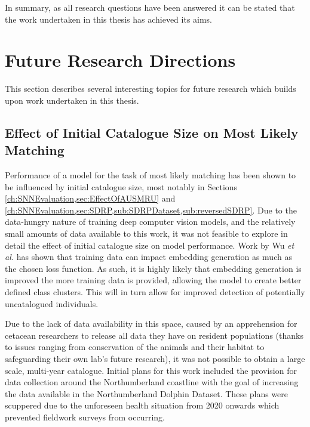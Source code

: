In summary, as all research questions have been answered it can be stated that the work undertaken in this thesis has achieved its aims. 

\section{Future Research Directions}\label{ch:Conclusion,sec:FutureWork}

This section describes several interesting topics for future research which builds upon work undertaken in this thesis.

\subsection{Effect of Initial Catalogue Size on Most Likely Matching}\label{ch:Conclusion,sec:FutureWork,sub:EffectOfCatalogueSize}

Performance of a model for the task of most likely matching has been shown to be influenced by initial catalogue size, most notably in Sections \ref{ch:SNNEvaluation,sec:EffectOfAUSMRU} and \ref{ch:SNNEvaluation,sec:SDRP,sub:SDRPDataset,sub:reversedSDRP}. Due to the data-hungry nature of training deep computer vision models, and the relatively small amounts of data available to this work, it was not feasible to explore in detail the effect of initial catalogue size on model performance. Work by Wu \textit{et al.} \cite{wu_sampling_2017} has shown that training data can impact embedding generation as much as the chosen loss function. As such, it is highly likely that embedding generation is improved the more training data is provided, allowing the model to create better defined class clusters. This will in turn allow for improved detection of potentially uncatalogued individuals. 

Due to the lack of data availability in this space, caused by an apprehension for cetacean researchers to release all data they have on resident populations (thanks to issues ranging from conservation of the animals and their habitat to safeguarding their own lab's future research), it was not possible to obtain a large scale, multi-year catalogue. Initial plans for this work included the provision for data collection around the Northumberland coastline with the goal of increasing the data available in the Northumberland Dolphin Dataset. These plans were scuppered due to the unforeseen health situation from 2020 onwards which prevented fieldwork surveys from occurring. 

